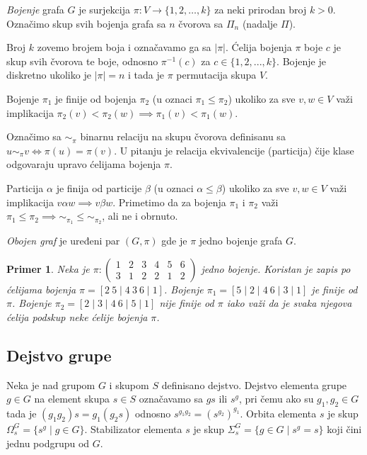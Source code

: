 \documentclass[12pt,oneside]{memoir}
\newtheorem{example}{Primer}
\theoremstyle{definition}
\begin{document}
   \emph{Bojenje} grafa $G$ je surjekcija $\pi : V \to \{1, 2, \dots, k\}$ za
   neki prirodan broj $k > 0$. Označimo skup svih bojenja grafa sa $n$ čvorova
   sa $\Pi_n$ (nadalje $\Pi$).

   Broj $k$ zovemo brojem boja i označavamo ga sa $|\pi|$.  Ćelija bojenja $\pi$
   boje $c$ je skup svih čvorova te boje, odnosno $\pi^{-1}(c)$ za $c \in \{1,
   2, ..., k\}$.  Bojenje je diskretno ukoliko je $|\pi| = n$ i tada je $\pi$
   permutacija skupa $V$.

   Bojenje $\pi_1$ je finije od bojenja $\pi_2$ (u oznaci $\pi_1 \leq \pi_2$)
   ukoliko za sve $v, w \in V$ važi implikacija $\pi_2(v) < \pi_2(w) \implies
   \pi_1(v) < \pi_1(w)$.

   Označimo sa $\sim_\pi$ binarnu relaciju na skupu čvorova definisanu sa $u
   \sim_\pi v \iff \pi(u) = \pi(v)$. U pitanju je relacija ekvivalencije
   (particija) čije klase odgovaraju upravo ćelijama bojenja $\pi$.

   Particija $\alpha$ je finija od particije $\beta$ (u oznaci $\alpha \leq
   \beta$) ukoliko za sve $v, w \in V$ važi implikacija $v \alpha w \implies v
   \beta w$. Primetimo da za bojenja $\pi_1$ i $\pi_2$ važi $\pi_1 \leq \pi_2
   \implies \sim_{\pi_1} \leq \sim_{\pi_2}$, ali ne i obrnuto.

   \emph{Obojen graf} je uređeni par $(G, \pi)$ gde je $\pi$ jedno bojenje
   grafa $G$.

   \begin{example}
	   Neka je $\pi :
	   \begin{pmatrix}
		   1 & 2 & 3 & 4 & 5 & 6 \\
		   3 & 1 & 2 & 2 & 1 & 2
	   \end{pmatrix}$
	   jedno bojenje. Koristan je zapis po ćelijama bojenja $\pi = [2\ 5 \mid
	   4\ 3\ 6 \mid 1]$. Bojenje $\pi_1 = [5 \mid 2 \mid 4\ 6 \mid 3 \mid 1]$
	   je finije od $\pi$. Bojenje $\pi_2 = [2 \mid 3 \mid 4\ 6 \mid 5 \mid 1]$
	   nije finije od $\pi$ iako važi da je svaka njegova ćelija podskup neke
	   ćelije bojenja $\pi$.
   \end{example}


   \subsection{Dejstvo grupe}

   Neka je nad grupom $G$ i skupom $S$ definisano dejstvo. Dejstvo elementa
   grupe $g \in G$ na element skupa $s \in S$ označavamo sa $gs$ ili $s^g$, pri
   čemu ako su $g_1, g_2 \in G$ tada je $(g_1g_2)s = g_1(g_2s)$ odnosno
   $s^{g_1g_2} = (s^{g_2})^{g_1}$.  Orbita elementa $s$ je skup $\Omega_s^G =
   \{s^g \mid g \in G\}$.  Stabilizator elementa $s$ je skup $\Sigma_s^G = \{g
   \in G \mid s^g=s\}$ koji čini jednu podgrupu od $G$.
\end{document}
